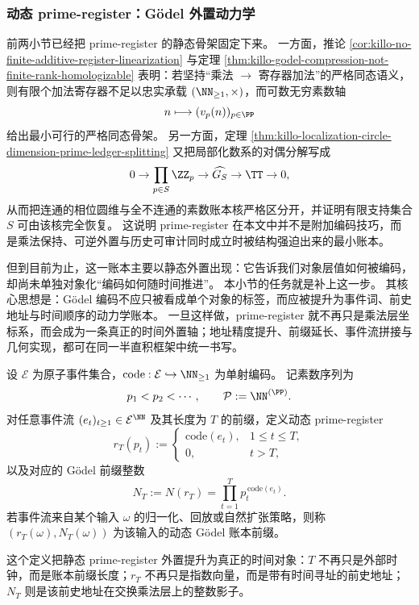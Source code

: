\subsubsection{动态 prime-register：Gödel 外置动力学}\label{subsubsec:emergent-arithmetic-dynamic-prime-register-godel-dynamics}

前两小节已经把 prime-register 的静态骨架固定下来。
一方面，推论 \ref{cor:killo-no-finite-additive-register-linearization} 与定理 \ref{thm:killo-godel-compression-not-finite-rank-homologizable} 表明：若坚持“乘法 \(\to\) 寄存器加法”的严格同态语义，则有限个加法寄存器不足以忠实承载 \((\NN_{\ge 1},\times)\)，而可数无穷素数轴
\[
n\longmapsto (v_p(n))_{p\in\PP}
\]
给出最小可行的严格同态骨架。
另一方面，定理 \ref{thm:killo-localization-circle-dimension-prime-ledger-splitting} 又把局部化数系的对偶分解写成
\[
0\to \prod_{p\in S}\ZZ_p\to \widehat{G_S}\to \TT\to 0,
\]
从而把连通的相位圆维与全不连通的素数账本核严格区分开，并证明有限支持集合 \(S\) 可由该核完全恢复。
这说明 prime-register 在本文中并不是附加编码技巧，而是乘法保持、可逆外置与历史可审计同时成立时被结构强迫出来的最小账本。

但到目前为止，这一账本主要以静态外置出现：它告诉我们对象层值如何被编码，却尚未单独对象化“编码如何随时间推进”。
本小节的任务就是补上这一步。
其核心思想是：Gödel 编码不应只被看成单个对象的标签，而应被提升为事件词、前史地址与时间顺序的动力学账本。
一旦这样做，prime-register 就不再只是乘法层坐标系，而会成为一条真正的时间外置轴；地址精度提升、前缀延长、事件流拼接与几何实现，都可在同一半直积框架中统一书写。

\begin{definition}\label{def:emergent-arithmetic-dynamic-prime-register-process}
设 \(\mathcal E\) 为原子事件集合，\(\mathrm{code}:\mathcal E\hookrightarrow \NN_{\ge 1}\) 为单射编码。
记素数序列为
\[
p_1<p_2<\cdots,
\qquad
\mathcal P:=\NN^{(\PP)}.
\]
对任意事件流 \((e_t)_{t\ge 1}\in \mathcal E^{\NN}\) 及其长度为 \(T\) 的前缀，定义动态 prime-register
\[
r_T(p_t):=
\begin{cases}
\mathrm{code}(e_t),& 1\le t\le T,\\
0,& t>T,
\end{cases}
\]
以及对应的 Gödel 前缀整数
\[
N_T:=N(r_T)=\prod_{t=1}^{T}p_t^{\,\mathrm{code}(e_t)}.
\]
若事件流来自某个输入 \(\omega\) 的归一化、回放或自然扩张策略，则称 \((r_T(\omega),N_T(\omega))\) 为该输入的动态 Gödel 账本前缀。
\end{definition}

这个定义把静态 prime-register 外置提升为真正的时间对象：\(T\) 不再只是外部时钟，而是账本前缀长度；\(r_T\) 不再只是指数向量，而是带有时间寻址的前史地址；\(N_T\) 则是该前史地址在交换乘法层上的整数影子。

